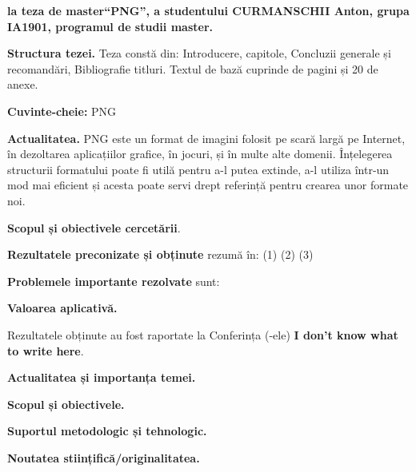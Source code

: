 \documentclass[a4paper,12pt]{report}
\newcommand{\authorName}{CURMANSCHII Anton}
\newcommand{\thesisTitle}{PNG}
\newcommand{\uniGroupName}{IA1901}
\newcommand{\thesisType}{master}
\newcommand{\programulDeStudii}{master}
\newcommand{\anexeCount}{20}
\newcommand{\conferencesList}{I don't know what to write here}
\begin{document}


\clearpage
\tableofcontents

\clearpage
{}
\begin{acronym}
\end{acronym}


\clearpage
{}

\textbf{la teza de \thesisType ``\thesisTitle'', a studentului \authorName{}, grupa \uniGroupName{}, programul de studii \programulDeStudii.}

\textbf{Structura tezei.}
Teza constă din: Introducere,  capitole, Concluzii generale și recomandări, Bibliografie \bibliographyEntryCount{} titluri.
Textul de bază cuprinde \usefulPageCount{} de pagini și \anexeCount{} de anexe.

\textbf{Cuvinte-cheie:} \ac{PNG}

\textbf{Actualitatea.}
PNG este un format de imagini folosit pe scară largă pe Internet,
în dezoltarea aplicațiilor grafice, în jocuri, și în multe alte domenii.
Înțelegerea structurii formatului poate fi utilă pentru a-l putea extinde, 
a-l utiliza într-un mod mai eficient și acesta poate servi drept referință pentru 
crearea unor formate noi.

\textbf{Scopul și obiectivele cercetării}.



\textbf{Rezultatele preconizate și obținute} rezumă în: (1) (2) (3)

\textbf{Problemele importante rezolvate} sunt:

\textbf{Valoarea aplicativă.}

Rezultatele obținute au fost raportate la Conferința (-ele) \textbf{\conferencesList}.



\textbf{Actualitatea și importanța temei.}

\textbf{Scopul și obiectivele.}

\textbf{Suportul metodologic și tehnologic.}

\textbf{Noutatea stiințifică/originalitatea.}
\end{document}
